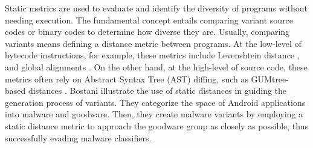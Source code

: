 \begin{strategy}
    \label{static_based}
    Static metrics are used to evaluate and identify the diversity of programs without needing execution. 
    The fundamental concept entails comparing variant source codes or binary codes to determine how diverse they are. 
    Usually, comparing variants means defining a distance metric between programs. 
    At the low-level of bytecode instructions, for example, these metrics include Levenshtein distance \cite{DBLP:journals/corr/abs-2111-09934}, and global alignments \cite{CROW}. 
    On the other hand, at the high-level of source code, these metrics often rely on Abstract Syntax Tree (AST) diffing, such as GUMtree-based distances \cite{gumtree}. 
    Bostani \etal \cite{Bostani2021EvadeDroidAP} illustrate the use of static distances in guiding the generation process of variants. 
    They categorize the space of Android applications into malware and goodware. 
    Then, they create malware variants by employing a static distance metric to approach the goodware group as closely as possible, thus successfully evading malware classifiers.
\end{strategy}

